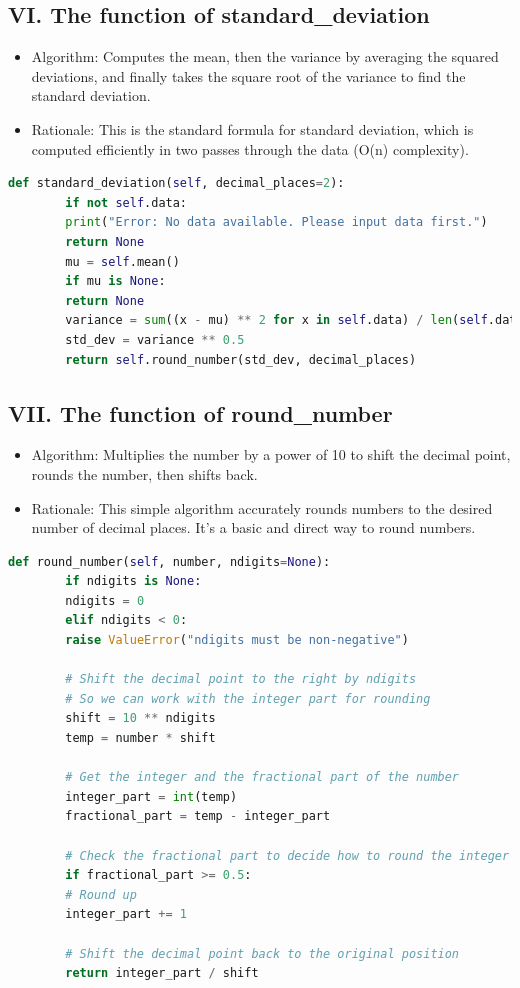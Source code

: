 \documentclass[english,12pt,a4paper]{report}
\begin{document}
	\subsection*{VI. The function of standard\_deviation}
	\begin{itemize}[leftmargin=*]
		\item Algorithm: Computes the mean, then the variance by averaging the squared deviations, and finally takes the square root of the variance to find the standard deviation.
		\item Rationale: This is the standard formula for standard deviation, which is computed efficiently in two passes through the data (O(n) complexity).
	\end{itemize}
	\begin{lstlisting}[language=Python, caption=Standard Deviation Method]
		def standard_deviation(self, decimal_places=2):
		if not self.data:
		print("Error: No data available. Please input data first.")
		return None
		mu = self.mean()
		if mu is None:
		return None
		variance = sum((x - mu) ** 2 for x in self.data) / len(self.data)
		std_dev = variance ** 0.5
		return self.round_number(std_dev, decimal_places)
	\end{lstlisting}
	
	
	\subsection*{VII. The function of round\_number}
	\begin{itemize}[leftmargin=*]
		\item Algorithm: Multiplies the number by a power of 10 to shift the decimal point, rounds the number, then shifts back.
		\item Rationale: This simple algorithm accurately rounds numbers to the desired number of decimal places. It's a basic and direct way to round numbers.
	\end{itemize}
	\begin{lstlisting}[language=Python, caption=Round Number Method]
		def round_number(self, number, ndigits=None):
		if ndigits is None:
		ndigits = 0
		elif ndigits < 0:
		raise ValueError("ndigits must be non-negative")
		
		# Shift the decimal point to the right by ndigits
		# So we can work with the integer part for rounding
		shift = 10 ** ndigits
		temp = number * shift
		
		# Get the integer and the fractional part of the number
		integer_part = int(temp)
		fractional_part = temp - integer_part
		
		# Check the fractional part to decide how to round the integer part
		if fractional_part >= 0.5:
		# Round up
		integer_part += 1
		
		# Shift the decimal point back to the original position
		return integer_part / shift
	\end{lstlisting}
		
\end{document}
